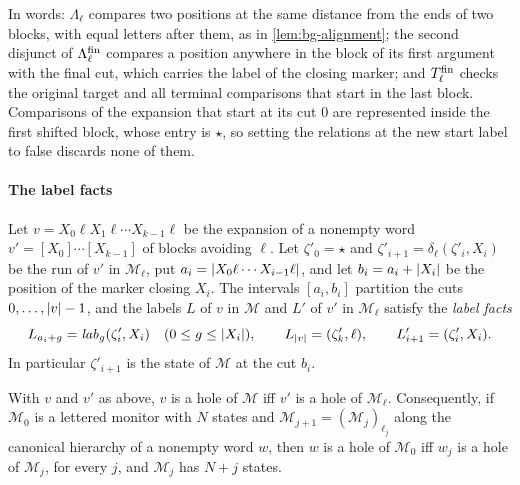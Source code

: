 In words: $\Lambda_\ell$ compares two positions at the same distance from the
ends of two blocks, with equal letters after them, as in
\cref{lem:bg-alignment}; the second disjunct of $\Lambda^{\mathrm{fin}}_\ell$ compares a position
anywhere in the block of its first argument with the final cut, which carries
the label of the closing marker; and $T^{\mathrm{fin}}_\ell$ checks the original target and
all terminal comparisons that start in the last block. Comparisons of the
expansion that start at its cut $0$ are represented inside the first shifted
block, whose entry is $\star$, so setting the relations at the new start label
to false discards none of them.

\paragraph{The label facts}
Let $v=X_0\ell X_1\ell\cdots X_{k-1}\ell$ be the expansion of a nonempty word
$v'=[X_0]\cdots[X_{k-1}]$ of blocks avoiding $\ell$. Let $\zeta'_0=\star$ and
$\zeta'_{i+1}=\delta_\ell(\zeta'_i,X_i)$ be the run of $v'$ in $\mathcal
M_\ell$, put $a_i=\lvert X_0\ell\cdots X_{i-1}\ell\rvert$, and let
$b_i=a_i+\lvert X_i\rvert$ be the position of the marker closing $X_i$. The intervals
$[a_i,b_i]$ partition the cuts $0,\ldots,\lvert v\rvert-1$, and the labels $L$ of $v$ in
$\mathcal M$ and $L'$ of $v'$ in $\mathcal M_\ell$ satisfy the \emph{label
facts} 
\begin{equation}\label{eq:bg-label-facts}
 L_{a_i+g}=\mathit{lab}_g(\zeta'_i,X_i)\quad(0\le g\le\lvert X_i\rvert),\qquad
 L_{\lvert v\rvert}=(\zeta'_k,\ell),\qquad
 L'_{i+1}=(\zeta'_i,X_i).
\end{equation}
In particular $\zeta'_{i+1}$ is the state of $\mathcal M$ at the cut $b_i$.

\begin{lemma}\label{lem:bg-desub}
With $v$ and $v'$ as above, $v$ is a hole of $\mathcal M$ iff $v'$ is a hole of
$\mathcal M_\ell$. Consequently, if $\mathcal M_0$ is a lettered monitor with $N$
states and $\mathcal M_{j+1}=(\mathcal M_j)_{\ell_j}$ along the canonical
hierarchy of a nonempty word $w$, then $w$ is a hole of $\mathcal M_0$ iff $w_j$
is a hole of $\mathcal M_j$, for every $j$, and $\mathcal M_j$ has $N+j$
states.
\end{lemma}


